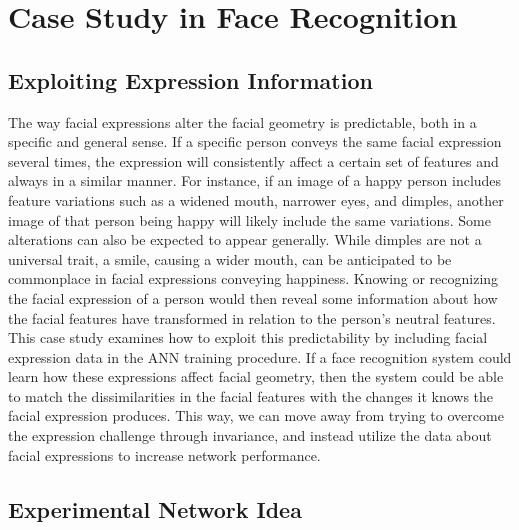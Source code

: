 

\section{Case Study in Face Recognition}



\subsection{Exploiting Expression Information}

The way facial expressions alter the facial geometry is predictable, both in a specific and general sense. If a specific person conveys the same facial expression several times, the expression will consistently affect a certain set of features and always in a similar manner. For instance, if an image of a happy person includes feature variations such as a widened mouth, narrower eyes, and dimples, another image of that person being happy will likely include the same variations. Some alterations can also be expected to appear generally. While dimples are not a universal trait, a smile, causing a wider mouth, can be anticipated to be commonplace in facial expressions conveying happiness. Knowing or recognizing the facial expression of a person would then reveal some information about how the facial features have transformed in relation to the person's neutral features. This case study examines how to exploit this predictability by including facial expression data in the ANN training procedure. If a face recognition system could learn how these expressions affect facial geometry, then the system could be able to match the dissimilarities in the facial features with the changes it knows the facial expression produces. This way, we can move away from trying to overcome the expression challenge through invariance, and instead utilize the data about facial expressions to increase network performance.

\subsection{Experimental Network Idea}

